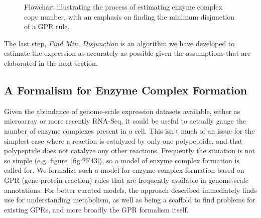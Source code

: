 \begin{methods}
\vspace{5 mm} 
\begin{figure}
\caption{Flowchart illustrating the process of estimating enzyme
complex copy number, with an emphasis on finding the minimum
disjunction of a GPR rule.}
\label{ECCN_flowchart}
\end{figure}

The last step, \emph{Find Min. Disjunction} is an algorithm we have
developed to estimate the expression as accurately as possible given
the assumptions that are elaborated in the next section.

\subsection{A Formalism for Enzyme Complex Formation}

Given the abundance of genome-scale expression datasets available, either as microarray or more
recently RNA-Seq, it could be useful to actually gauge the number of enzyme complexes present 
in a cell. This isn't much of an issue for the simplest case where a reaction is
catalyzed by only one polypeptide, and that polypeptide does not catalyze any other reactions.
Frequently the situation is not so simple (e.g. figure~\ref{fig:2F43}), 
so a model of enzyme complex formation is called for.
We formalize such a model for enzyme complex formation based 
on GPR (gene-protein-reaction) rules that are frequently available
in genome-scale annotations. For better curated models, the approach described immediately finds
use for understanding metabolism, as well as being a scaffold to find problems for
existing GPRs, and more broadly the GPR formalism itself.


\end{methods}
